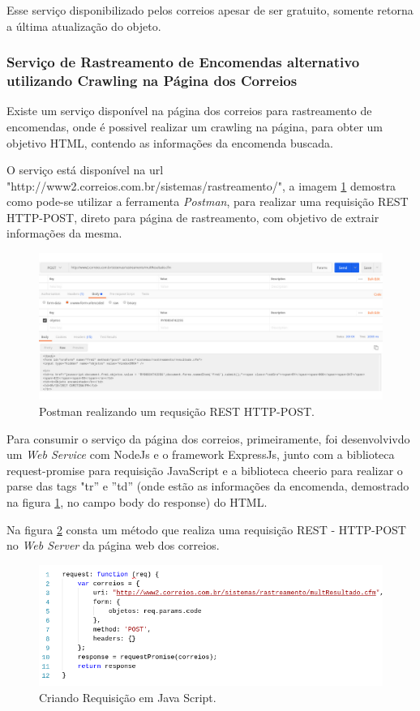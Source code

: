 \documentclass[a4paper, 12pt]{article}
\begin{document}
Esse serviço disponibilizado pelos correios apesar de ser gratuito, somente retorna a última atualização do objeto.
\subsubsection{Serviço de Rastreamento de Encomendas alternativo utilizando Crawling na Página dos Correios}\label{web:alt}

Existe um serviço disponível na página dos correios para rastreamento de encomendas, onde é possivel realizar um crawling na página, para obter um objetivo HTML, contendo as informações da encomenda buscada.

O serviço está disponível na url "http://www2.correios.com.br/sistemas/rastreamento/", a imagem \ref{c1} demostra como pode-se utilizar a ferramenta \textit{Postman}, para realizar uma requisição REST HTTP-POST, direto para página de rastreamento, com objetivo de extrair informações da mesma.

\begin{figure}[H]
	\centering
	\includegraphics[scale=0.3]{Imagens/c1.jpg}
	\caption{Postman realizando um requsição REST HTTP-POST.}
	\label{c1}
\end{figure}


Para consumir o serviço da página dos correios, primeiramente, foi desenvolvivdo um \textit{Web Service} com NodeJs e o framework ExpressJs, junto com a biblioteca request-promise para requisição JavaScript e a biblioteca cheerio para realizar o parse das tags "tr'' e ''td'' (onde estão as informações da encomenda, demostrado na figura  \ref{c1}, no campo body do response) do HTML.

Na figura \ref{c3} consta um método que realiza uma requisição REST - HTTP-POST no \textit{Web Server} da página web dos correios.
\begin{figure}[H]
	\centering
	\includegraphics[scale=0.55]{Imagens/req.png}
	\caption{Criando Requisição em Java Script.}
	\label{c3}
\end{figure}
\end{document}
